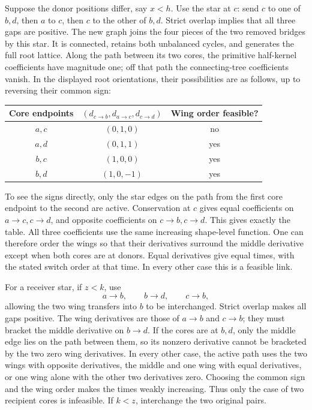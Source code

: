 Suppose the donor positions differ, say \(x<h\).  Use the star at
\(c\): send \(c\) to one of \(b,d\), then \(a\) to \(c\), then
\(c\) to the other of \(b,d\).  Strict overlap implies that all three
gaps are positive.  The new graph joins the four pieces of the two
removed bridges by this star.  It is connected, retains both
unbalanced cycles, and generates the full root lattice.  Along the
path between its two cores, the primitive half-kernel coefficients
have magnitude one; off that path the connecting-tree coefficients
vanish.  In the displayed root orientations, their possibilities are
as follows, up to reversing their common sign:
\begin{center}
\begin{tabular}{@{}ccc@{}}
\toprule
Core endpoints & \((d_{c\to b},d_{a\to c},d_{c\to d})\)
 & Wing order feasible?\\
\midrule
\(a,c\) & \((0,1,0)\) & no\\
\(a,d\) & \((0,1,1)\) & yes\\
\(b,c\) & \((1,0,0)\) & yes\\
\(b,d\) & \((1,0,-1)\) & yes\\
\bottomrule
\end{tabular}
\end{center}
To see the signs directly, only the star edges on the path from the
first core endpoint to the second are active.  Conservation at
\(c\) gives equal coefficients on \(a\to c,c\to d\), and opposite
coefficients on \(c\to b,c\to d\).  This gives exactly the table.
All three coefficients use the same increasing shape-level function.
One can therefore order the wings so that their derivatives surround
the middle derivative except when both cores are at donors.  Equal
derivatives give equal times, with the stated switch order at that
time.  In every other case this is a feasible link.

For a receiver star, if \(z<k\), use
\[
 a\longrightarrow b,\qquad b\longrightarrow d,\qquad
 c\longrightarrow b,
\]
allowing the two wing transfers into \(b\) to be interchanged.
Strict overlap makes all gaps positive.  The wing derivatives are
those of \(a\to b\) and \(c\to b\); they must bracket the middle
derivative on \(b\to d\).  If the cores are at \(b,d\), only the
middle edge lies on the path between them, so its nonzero derivative
cannot be bracketed by the two zero wing derivatives.  In every
other case, the active path uses the two wings with opposite
derivatives, the middle and one wing with equal derivatives, or one
wing alone with the other two derivatives zero.  Choosing the common
sign and the wing order makes the times weakly increasing.  Thus
only the case of two recipient cores is infeasible.  If \(k<z\),
interchange the two original pairs.

